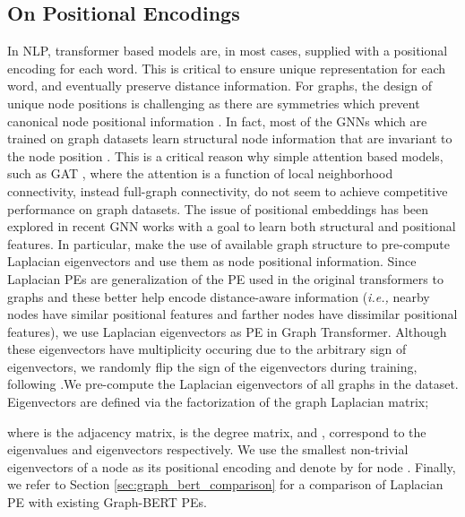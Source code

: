 \documentclass[letterpaper]{article} \usepackage{aaai21}  \usepackage{times}  \usepackage{helvet} \usepackage{courier}  \usepackage[hyphens]{url}  \usepackage{graphicx} \urlstyle{rm} \def\UrlFont{\rm}  \usepackage{natbib}  \usepackage{caption} \usepackage{xcolor}
\begin{document}
\subsection{On Positional Encodings}
\label{sec:on_positional_encodings}
In NLP, transformer based models are, in most cases, supplied with a positional encoding for each word. This is critical to ensure unique representation for each word, and eventually preserve distance information. For graphs, the design of unique node positions is challenging as there are symmetries which prevent canonical node positional information \cite{murphy2019relational}. In fact, most of the GNNs which are trained on graph datasets learn structural node information that are invariant to the node position \cite{srinivasan2019equivalence}. This is a critical reason why simple attention based models, such as GAT \cite{velickovic2018graph}, where the attention is a function of local neighborhood connectivity, instead full-graph connectivity, do not seem to achieve competitive performance on graph datasets. The issue of positional embeddings has been explored in recent GNN works \cite{murphy2019relational, you2019position, srinivasan2019equivalence, dwivedi2020benchmarking, li2020distance} with a goal to learn both structural and positional features. In particular, \citet{dwivedi2020benchmarking} make the use of available graph structure to pre-compute Laplacian eigenvectors \cite{belkin2003laplacian} and use them as node positional information. 
Since Laplacian PEs are generalization of the PE used in the original transformers \cite{vaswani2017attention} to graphs and these better help encode distance-aware information (\textit{i.e.,} nearby nodes have similar positional features and farther nodes have dissimilar positional features), we use Laplacian eigenvectors as PE in Graph Transformer. Although these eigenvectors have multiplicity occuring due to the arbitrary sign of eigenvectors, we randomly flip the sign of the eigenvectors during training, following \citet{dwivedi2020benchmarking}.We pre-compute the Laplacian eigenvectors of all graphs in the dataset. Eigenvectors are defined via the factorization of the graph Laplacian matrix;

where  is the   adjacency matrix,  is the degree matrix, and ,  correspond to the eigenvalues and eigenvectors respectively. We use the  smallest non-trivial eigenvectors of a node as its positional encoding and denote by  for node . 
Finally, we refer to Section \ref{sec:graph_bert_comparison} for a comparison of Laplacian PE with existing Graph-BERT PEs.
\end{document}

